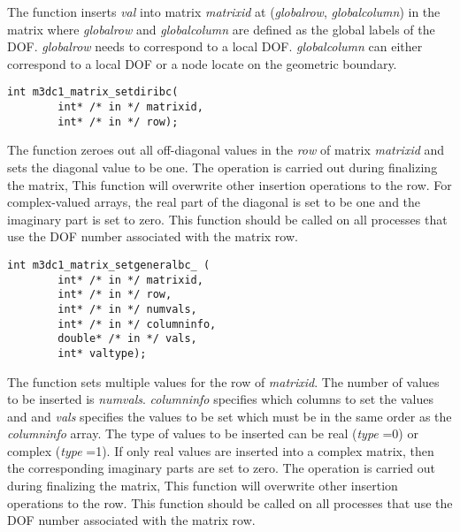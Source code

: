 The function inserts \textit{val} into matrix \textit{matrixid} at
	       (\textit{globalrow}, \textit{globalcolumn}) in the matrix 
	       where \textit{globalrow} and \textit{globalcolumn} are defined as the global labels of the DOF.
	       \textit{globalrow} needs to correspond to a local DOF.
	        \textit{globalcolumn} can either  correspond to a local DOF or a node locate on the geometric boundary.

\begin{verbatim}
int m3dc1_matrix_setdiribc(
        int* /* in */ matrixid, 
        int* /* in */ row);
\end{verbatim}\vspace{-.5cm}\hspace{1cm}
	       
The function zeroes out all off-diagonal values in the \textit{row}  of  matrix \textit{matrixid}
	       and sets the diagonal value to be one.
	       The operation is carried out during finalizing the matrix, 
	       This function will overwrite other insertion operations to the row.
	       For complex-valued arrays,
	       the real part of the diagonal is set to be one and the imaginary part is set to zero.
	       This function should be called on all processes that use the DOF number associated with the matrix row.

\begin{verbatim}
int m3dc1_matrix_setgeneralbc_ (
        int* /* in */ matrixid, 
        int* /* in */ row, 
        int* /* in */ numvals,
        int* /* in */ columninfo, 
        double* /* in */ vals, 
        int* valtype);
\end{verbatim}\vspace{-.5cm}\hspace{1cm}

 The function sets multiple values for the row of \textit{matrixid}.
	       The  number of values to be inserted is \textit{numvals}. 
	       \textit{columninfo} specifies which columns to set the values and 
	       and \textit{vals} specifies the values to be set
	       which must be in the same order as the \textit{columninfo} array.
	       The type of values to be inserted can be real (\textit{type} =0) or complex (\textit{type} =1).
	       If only real values are inserted into a complex matrix,
	       then the corresponding imaginary parts are set to zero. 
	       The operation is carried out during finalizing the matrix, 
	       This function will overwrite other insertion operations to the row.
	       This function should be called on all processes that use the DOF number associated with the matrix row.

